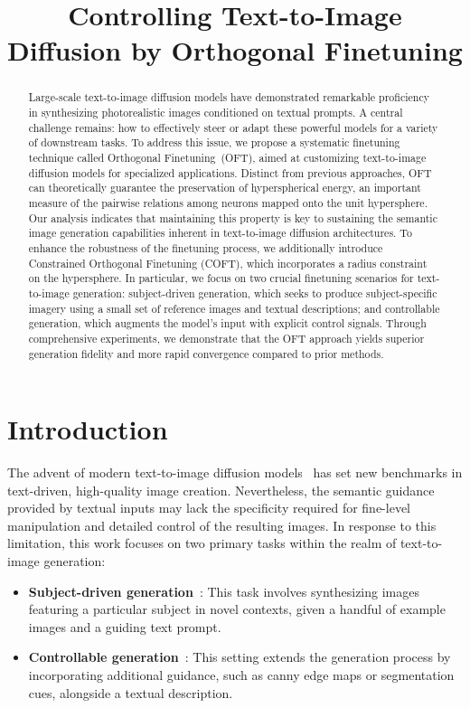 \title{Controlling Text-to-Image Diffusion by Orthogonal Finetuning}

\begin{abstract}
Large-scale text-to-image diffusion models have demonstrated remarkable proficiency in synthesizing photorealistic images conditioned on textual prompts. A central challenge remains: how to effectively steer or adapt these powerful models for a variety of downstream tasks. To address this issue, we propose a systematic finetuning technique called Orthogonal Finetuning~(OFT), aimed at customizing text-to-image diffusion models for specialized applications. Distinct from previous approaches, OFT can theoretically guarantee the preservation of hyperspherical energy, an important measure of the pairwise relations among neurons mapped onto the unit hypersphere. Our analysis indicates that maintaining this property is key to sustaining the semantic image generation capabilities inherent in text-to-image diffusion architectures. To enhance the robustness of the finetuning process, we additionally introduce Constrained Orthogonal Finetuning (COFT), which incorporates a radius constraint on the hypersphere. In particular, we focus on two crucial finetuning scenarios for text-to-image generation: subject-driven generation, which seeks to produce subject-specific imagery using a small set of reference images and textual descriptions; and controllable generation, which augments the model’s input with explicit control signals. Through comprehensive experiments, we demonstrate that the OFT approach yields superior generation fidelity and more rapid convergence compared to prior methods.
\end{abstract}

\section{Introduction}

The advent of modern text-to-image diffusion models~\cite{saharia2022photorealistic,ramesh2022hierarchical,rombach2022high} has set new benchmarks in text-driven, high-quality image creation. Nevertheless, the semantic guidance provided by textual inputs may lack the specificity required for fine-level manipulation and detailed control of the resulting images. In response to this limitation, this work focuses on two primary tasks within the realm of text-to-image generation:

\begin{itemize}[leftmargin=*,nosep]

    \item \textbf{Subject-driven generation}~\cite{ruiz2023dreambooth}: This task involves synthesizing images featuring a particular subject in novel contexts, given a handful of example images and a guiding text prompt.
    \item \textbf{Controllable generation}~\cite{zhang2023adding,mou2023t2i}: This setting extends the generation process by incorporating additional guidance, such as canny edge maps or segmentation cues, alongside a textual description.
\end{itemize}


